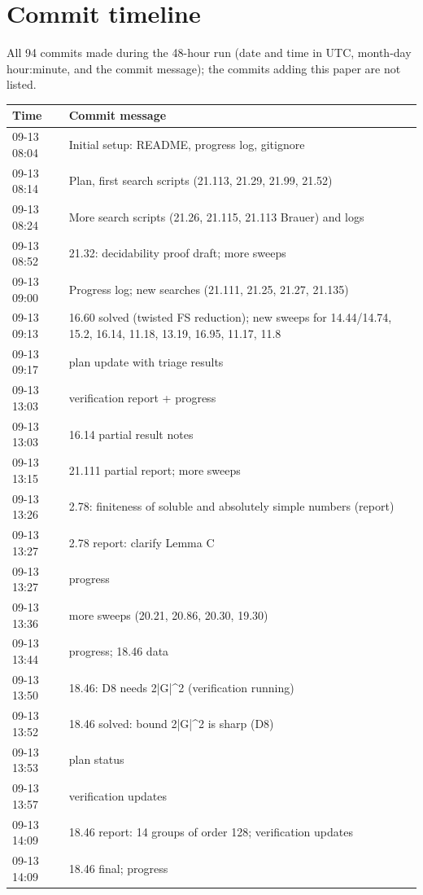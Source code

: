 \section{Commit timeline}\label{app:timeline}
All 94 commits made during the 48-hour run (date and time in UTC, month-day hour:minute, and the commit message); the commits adding this paper are not listed.
\small
\begin{longtable}{lp{12.5cm}}
\toprule
Time & Commit message \\
\midrule
\endhead
09-13 08:04 & Initial setup: README, progress log, gitignore \\
09-13 08:14 & Plan, first search scripts (21.113, 21.29, 21.99, 21.52) \\
09-13 08:24 & More search scripts (21.26, 21.115, 21.113 Brauer) and logs \\
09-13 08:52 & 21.32: decidability proof draft; more sweeps \\
09-13 09:00 & Progress log; new searches (21.111, 21.25, 21.27, 21.135) \\
09-13 09:13 & 16.60 solved (twisted FS reduction); new sweeps for 14.44/14.74, 15.2, 16.14, 11.18, 13.19, 16.95, 11.17, 11.8 \\
09-13 09:17 & plan update with triage results \\
09-13 13:03 & verification report + progress \\
09-13 13:03 & 16.14 partial result notes \\
09-13 13:15 & 21.111 partial report; more sweeps \\
09-13 13:26 & 2.78: finiteness of soluble and absolutely simple numbers (report) \\
09-13 13:27 & 2.78 report: clarify Lemma C \\
09-13 13:27 & progress \\
09-13 13:36 & more sweeps (20.21, 20.86, 20.30, 19.30) \\
09-13 13:44 & progress; 18.46 data \\
09-13 13:50 & 18.46: D8 needs 2|G|\^{}2 (verification running) \\
09-13 13:52 & 18.46 solved: bound 2|G|\^{}2 is sharp (D8) \\
09-13 13:53 & plan status \\
09-13 13:57 & verification updates \\
09-13 14:09 & 18.46 report: 14 groups of order 128; verification updates \\
09-13 14:09 & 18.46 final; progress \\

\end{longtable}
